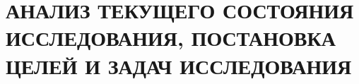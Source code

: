 \chapter{АНАЛИЗ ТЕКУЩЕГО СОСТОЯНИЯ ИССЛЕДОВАНИЯ, ПОСТАНОВКА ЦЕЛЕЙ И ЗАДАЧ ИССЛЕДОВАНИЯ}\label{ch:ch1}

% 





% 
% 
